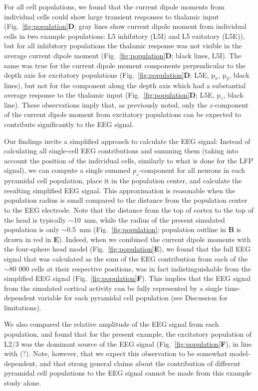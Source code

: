 \documentclass[preprint,10pt,authoryear]{elsarticle}
\newcommand{\hlg}[2][Emerald]{ {\sethlcolor{#1} \hl{#2}} }
\newcommand{\tvnnote}[1]{\color{white}{\hlg{TVN: #1 }}\color{black}}
\newcommand{\gex}[1]{{\color{Orange}#1}}
\begin{document}
For all cell populations, we found that the current dipole moment\gex{s} from individual cells could show large transient responses to thalamic input (Fig.~\ref{fig:population}\textbf{D}; gray lines show current dipole moment from individual cells in two example populations: L5 inhibitory (L5I) and L5 exitatory (L5E)), but for all inhibitory populations the thalamic response was not visible in the average current dipole moment (Fig.~\ref{fig:population}\textbf{D}; black lines, L5I). The same was true for the current dipole moment components perpendicular to the depth axis for excitatory populations (Fig.~\ref{fig:population}\textbf{D}; L5E, p$_x$, p$_y$, black lines), but not for the component along the depth axis which had a substantial average response to the thalamic input (Fig.~\ref{fig:population}\textbf{D}; L5E, p$_z$, black line). 
These observations imply that, as previously noted, only the \gex{$z$}-component of the current dipole moment from excitatory populations can be expected to contribute significantly to the EEG signal.

Our findings invite a simplified approach to calculate the EEG signal: Instead of calculating all single-cell EEG contributions and summing them (taking into account the position of the individual cells, similarly to what is done for the LFP signal), we can compute \gex{a single} summed $p_z$-component \gex{for all neurons in} each pyramidal cell population, place it in the population center, and calculate the resulting simplified EEG signal. This approximation is reasonable when the population radius is small compared to the distance from the population center to the EEG electrode. Note that the distance from the top of cortex to the top of the head is typically $\sim$10~mm, while the radius of the \gex{present} simulated population is only 
$\sim$0.5~mm (Fig.~\ref{fig:population}; population outline in \textbf{B} is drawn in red in \textbf{E}).
Indeed, when we combined the current dipole moments with the four-sphere head model (Fig.~\ref{fig:population}\textbf{E}), we found that the full EEG signal that was calculated as the sum of the EEG contribution from each of the $\sim$80 000 cells at their respective positions, was in fact indistinguishable from the simplified EEG signal (Fig.~\ref{fig:population}\textbf{F}). This implies that \gex{the EEG signal from the simulated cortical activity can be fully represented by} a single time-dependent \gex{variable} for each pyramidal cell population (see Discussion for limitations).

We also compared the relative amplitude of the EEG signal from each population, and found that \gex{for the present example}, the excitatory population of L2/3 was the dominant source of the EEG signal (Fig.~\ref{fig:population}\textbf{F}), in line with (?)\tvnnote{(cite!)}. Note, however, that we expect this observation to be somewhat model-dependent, \gex{and that strong general claims about the contribution of different pyramidal cell populations to the EEG signal cannot be made from this example study alone.}
\end{document}
